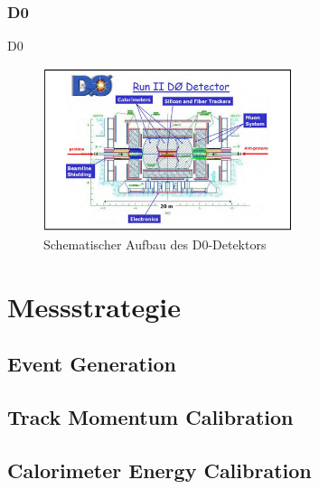 \documentclass[aspectratio=1610, 9pt]{beamer}
\begin{document}
\subsubsection{D0}

\begin{frame}{D0}
  \begin{figure}
    \includegraphics[width=0.65\textwidth]{images/d0.jpg}
    \caption{Schematischer Aufbau des D0-Detektors \cite{D0}}
  \end{figure}
\end{frame}

\section{Messstrategie}

\subsection{Event Generation}

\begin{frame}{}

\end{frame}

\subsection{Track Momentum Calibration}

\begin{frame}{}

\end{frame}

\subsection{Calorimeter Energy Calibration}

\begin{frame}{}

\end{frame}
\end{document}

